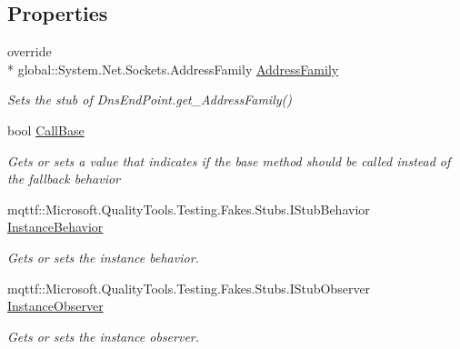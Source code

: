 \subsection*{Properties}
\begin{DoxyCompactItemize}
\item 
override \\*
global\-::\-System.\-Net.\-Sockets.\-Address\-Family \hyperlink{class_system_1_1_net_1_1_fakes_1_1_stub_dns_end_point_a1037a56a4e010687b9720da1cf77c124}{Address\-Family}
\begin{DoxyCompactList}\small\item\em Sets the stub of Dns\-End\-Point.\-get\-\_\-\-Address\-Family()\end{DoxyCompactList}\item 
bool \hyperlink{class_system_1_1_net_1_1_fakes_1_1_stub_dns_end_point_a88ec14c4dd756bd77f632edf4791f29b}{Call\-Base}
\begin{DoxyCompactList}\small\item\em Gets or sets a value that indicates if the base method should be called instead of the fallback behavior\end{DoxyCompactList}\item 
mqttf\-::\-Microsoft.\-Quality\-Tools.\-Testing.\-Fakes.\-Stubs.\-I\-Stub\-Behavior \hyperlink{class_system_1_1_net_1_1_fakes_1_1_stub_dns_end_point_a6fe7fff14f46bdc93581d2bfa4f4b6f4}{Instance\-Behavior}
\begin{DoxyCompactList}\small\item\em Gets or sets the instance behavior.\end{DoxyCompactList}\item 
mqttf\-::\-Microsoft.\-Quality\-Tools.\-Testing.\-Fakes.\-Stubs.\-I\-Stub\-Observer \hyperlink{class_system_1_1_net_1_1_fakes_1_1_stub_dns_end_point_abca74756c5c2b09d10d3e9e559f53b41}{Instance\-Observer}
\begin{DoxyCompactList}\small\item\em Gets or sets the instance observer.\end{DoxyCompactList}\end{DoxyCompactItemize}


